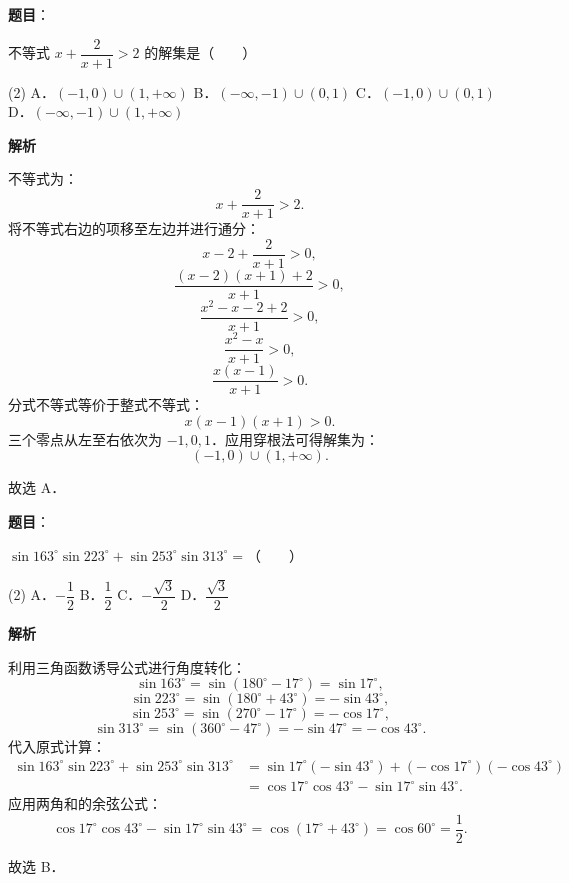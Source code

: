 \begin{answer}

\textbf{题目}：

不等式 $x + \dfrac{2}{x + 1} > 2$ 的解集是\mbox{（　　）}

\begin{gkopts}(2)
\task A．$(-1, 0) \cup (1, +\infty)$
\task B．$(-\infty, -1) \cup (0, 1)$
\task C．$(-1, 0) \cup (0, 1)$
\task D．$(-\infty, -1) \cup (1, +\infty)$
\end{gkopts}

\textbf{解析}

不等式为：
\nopagebreak[4]
\[
x + \frac{2}{x + 1} > 2.
\]
将不等式右边的项移至左边并进行通分：
\nopagebreak[4]
\[
x - 2 + \frac{2}{x + 1} > 0,
\]
\nopagebreak[4]
\[
\frac{(x - 2)(x + 1) + 2}{x + 1} > 0,
\]
\nopagebreak[4]
\[
\frac{x^2 - x - 2 + 2}{x + 1} > 0,
\]
\nopagebreak[4]
\[
\frac{x^2 - x}{x + 1} > 0,
\]
\nopagebreak[4]
\[
\frac{x(x - 1)}{x + 1} > 0.
\]
分式不等式等价于整式不等式：
\nopagebreak[4]
\[
x(x - 1)(x + 1) > 0.
\]
三个零点从左至右依次为 $-1, 0, 1$．应用穿根法可得解集为：
\nopagebreak[4]
\[
(-1, 0) \cup (1, +\infty).
\]

故选 A．


\end{answer}
\begin{answer}

\textbf{题目}：

$\sin 163^\circ \sin 223^\circ + \sin 253^\circ \sin 313^\circ =$\mbox{（　　）}

\begin{gkopts}(2)
\task A．$-\dfrac{1}{2}$
\task B．$\dfrac{1}{2}$
\task C．$-\dfrac{\sqrt{3}}{2}$
\task D．$\dfrac{\sqrt{3}}{2}$
\end{gkopts}

\textbf{解析}

利用三角函数诱导公式进行角度转化：
\nopagebreak[4]
\[
\sin 163^\circ = \sin(180^\circ - 17^\circ) = \sin 17^\circ,
\]
\nopagebreak[4]
\[
\sin 223^\circ = \sin(180^\circ + 43^\circ) = -\sin 43^\circ,
\]
\nopagebreak[4]
\[
\sin 253^\circ = \sin(270^\circ - 17^\circ) = -\cos 17^\circ,
\]
\nopagebreak[4]
\[
\sin 313^\circ = \sin(360^\circ - 47^\circ) = -\sin 47^\circ = -\cos 43^\circ.
\]
代入原式计算：
\nopagebreak[4]
\[
\begin{aligned}
\sin 163^\circ \sin 223^\circ + \sin 253^\circ \sin 313^\circ &= \sin 17^\circ (-\sin 43^\circ) + (-\cos 17^\circ)(-\cos 43^\circ) \\
&= \cos 17^\circ \cos 43^\circ - \sin 17^\circ \sin 43^\circ.
\end{aligned}
\]
应用两角和的余弦公式：
\nopagebreak[4]
\[
\cos 17^\circ \cos 43^\circ - \sin 17^\circ \sin 43^\circ = \cos(17^\circ + 43^\circ) = \cos 60^\circ = \frac{1}{2}.
\]

故选 B．


\end{answer}
